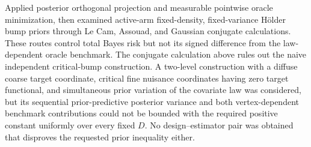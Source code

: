 Applied posterior orthogonal projection and measurable pointwise oracle minimization, then examined active-arm fixed-density, fixed-variance Hölder bump priors through Le Cam, Assouad, and Gaussian conjugate calculations.  These routes control total Bayes risk but not its signed difference from the law-dependent oracle benchmark.  The conjugate calculation above rules out the naive independent critical-bump construction.  A two-level construction with a diffuse coarse target coordinate, critical fine nuisance coordinates having zero target functional, and simultaneous prior variation of the covariate law was considered, but its sequential prior-predictive posterior variance and both vertex-dependent benchmark contributions could not be bounded with the required positive constant uniformly over every fixed \(D\).  No design--estimator pair was obtained that disproves the requested prior inequality either.